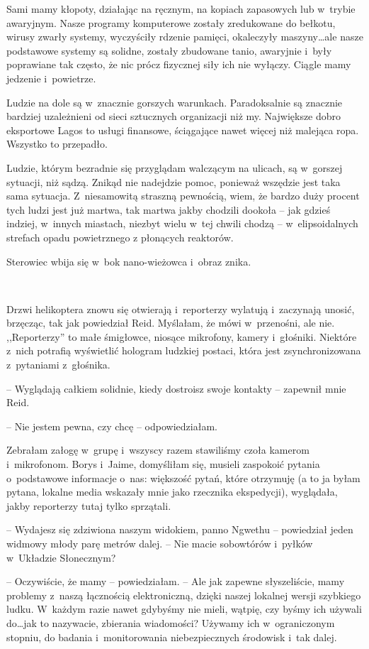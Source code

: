 \documentclass[oneside,polish,11pt,sfheadings]{mwbk}
\begin{document}
Sami mamy kłopoty, działając na ręcznym, na kopiach zapasowych lub w~trybie awaryjnym. Nasze programy komputerowe zostały zredukowane do
bełkotu, wirusy zwarły systemy, wyczyściły rdzenie pamięci, okaleczyły
maszyny\ldots  ale nasze podstawowe systemy są solidne, zostały zbudowane
tanio, awaryjnie i~były poprawiane tak często, że nic prócz fizycznej
siły ich nie wyłączy. Ciągle mamy jedzenie i~powietrze.

Ludzie na dole są w~znacznie gorszych warunkach. Paradoksalnie są
znacznie bardziej uzależnieni od sieci sztucznych organizacji niż my.
Największe dobro eksportowe Lagos to usługi finansowe, ściągające nawet
więcej niż malejąca ropa. Wszystko to przepadło.

Ludzie, którym bezradnie się przyglądam walczącym na ulicach, są w~gorszej sytuacji, niż sądzą. Znikąd nie nadejdzie pomoc, ponieważ
wszędzie jest taka sama sytuacja. Z~niesamowitą straszną pewnością,
wiem, że bardzo duży procent tych ludzi jest już martwa, tak martwa
jakby chodzili dookoła -- jak gdzieś indziej, w~innych miastach, niezbyt
wielu w~tej chwili chodzą -- w~elipsoidalnych strefach opadu powietrznego
z płonących reaktorów.

Sterowiec wbija się w~bok nano-wieżowca i~obraz znika.

~

Drzwi helikoptera znowu się otwierają i~reporterzy wylatują i~zaczynają
unosić, brzęcząc, tak jak powiedział Reid. Myślałam, że mówi w~przenośni, ale nie. ,,Reporterzy'' to małe śmigłowce, niosące mikrofony,
kamery i~głośniki. Niektóre z~nich potrafią wyświetlić hologram ludzkiej
postaci, która jest zsynchronizowana z~pytaniami z~głośnika.

-- Wyglądają całkiem solidnie, kiedy dostroisz swoje kontakty -- zapewnił
mnie Reid.

-- Nie jestem pewna, czy chcę -- odpowiedziałam.

Zebrałam załogę w~grupę i~wszyscy razem stawiliśmy czoła kamerom i~mikrofonom. Borys i~Jaime, domyśliłam się, musieli zaspokoić pytania o~podstawowe informacje o~nas: większość pytań, które otrzymuję (a to ja
byłam pytana, lokalne media wskazały mnie jako rzecznika ekspedycji),
wyglądała, jakby reporterzy tutaj tylko sprzątali.

-- Wydajesz się zdziwiona naszym widokiem, panno Ngwethu -- powiedział
jeden widmowy młody parę metrów dalej. -- Nie macie sobowtórów i~pyłków w~Układzie Słonecznym?

-- Oczywiście, że mamy -- powiedziałam. -- Ale jak zapewne słyszeliście,
mamy problemy z~naszą łącznością elektroniczną, dzięki naszej lokalnej
wersji szybkiego ludku. W~każdym razie nawet gdybyśmy nie mieli, wątpię,
czy byśmy ich używali do\ldots  jak to nazywacie, zbierania wiadomości?
Używamy ich w~ograniczonym stopniu, do badania i~monitorowania
niebezpiecznych środowisk i~tak dalej.
\end{document}

